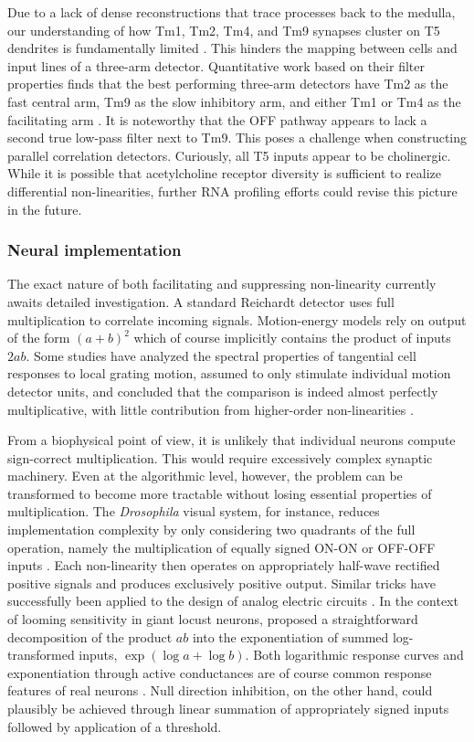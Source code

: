 Due to a lack of dense reconstructions that trace processes back to the medulla, our understanding of how Tm1, Tm2, Tm4, and Tm9 synapses cluster on T5 dendrites is fundamentally limited \citep{Shinomiya:2014dx}. This hinders the mapping between cells and input lines of a three-arm detector. Quantitative work based on their filter properties finds that the best performing three-arm detectors have Tm2 as the fast central arm, Tm9 as the slow inhibitory arm, and either Tm1 or Tm4 as the facilitating arm \citep{Arenz:2017aa}. It is noteworthy that the OFF pathway appears to lack a second true low-pass filter next to Tm9. This poses a challenge when constructing parallel correlation detectors. Curiously, all T5 inputs appear to be cholinergic. While it is possible that acetylcholine receptor diversity is sufficient to realize differential non-linearities, further RNA profiling efforts could revise this picture in the future.

\subsubsection{Neural implementation}
The exact nature of both facilitating and suppressing non-linearity currently awaits detailed investigation. A standard Reichardt detector uses full multiplication to correlate incoming signals. Motion-energy models rely on output of the form $(a+b)^2$ which of course implicitly contains the product of inputs $2ab$. Some studies have analyzed the spectral properties of tangential cell responses to local grating motion, assumed to only stimulate individual motion detector units, and concluded that the comparison is indeed almost perfectly multiplicative, with little contribution from higher-order non-linearities \citep{Egelhaaf:1989wf}.

From a biophysical point of view, it is unlikely that individual neurons compute sign-correct multiplication. This would require excessively complex synaptic machinery. Even at the algorithmic level, however, the problem can be transformed to become more tractable without losing essential properties of multiplication. The \textit{Drosophila} visual system, for instance, reduces implementation complexity by only considering two quadrants of the full operation, namely the multiplication of equally signed ON-ON or OFF-OFF inputs \citep{Eichner:2011ic}. Each non-linearity then operates on appropriately half-wave rectified positive signals and produces exclusively positive output. Similar tricks have successfully been applied to the design of analog electric circuits \citep{Mead:1989aa}. In the context of looming sensitivity in giant locust neurons, \citet{Gabbiani:2002kb} proposed a straightforward decomposition of the product $ab$ into the exponentiation of summed log-transformed inputs, $\exp(\log a + \log b)$. Both logarithmic response curves and exponentiation through active conductances are of course common response features of real neurons \citep{Koch:2004aa}. Null direction inhibition, on the other hand, could plausibly be achieved through linear summation of appropriately signed inputs followed by application of a threshold.

